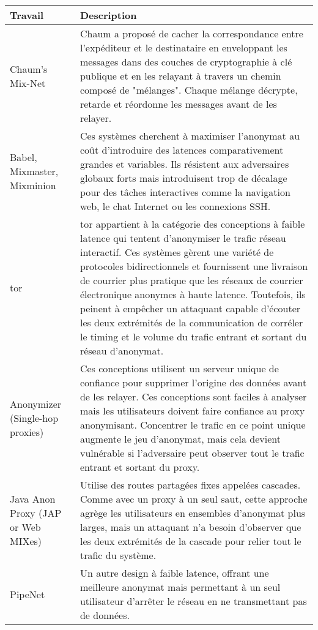 \begin{table}[htbp]
    \centering
    \begin{tabularx}{\textwidth}{
        >{\raggedright\arraybackslash}p{2cm} 
        >{\raggedright\arraybackslash}X}
    \toprule
    \rowcolor[HTML]{EFEFEF}
    \textbf{Travail} & \textbf{Description} \\
    \midrule
    Chaum's Mix-Net & Chaum a proposé de cacher la correspondance entre l'expéditeur et le destinataire en enveloppant les messages dans des couches de cryptographie à clé publique et en les relayant à travers un chemin composé de "mélanges". Chaque mélange décrypte, retarde et réordonne les messages avant de les relayer. \\
    \midrule
    Babel, Mixmaster, Mixminion & Ces systèmes cherchent à maximiser l'anonymat au coût d'introduire des latences comparativement grandes et variables. Ils résistent aux adversaires globaux forts mais introduisent trop de décalage pour des tâches interactives comme la navigation web, le chat Internet ou les connexions SSH. \\
    \midrule
    \acrshort{tor} & \acrshort{tor} appartient à la catégorie des conceptions à faible latence qui tentent d'anonymiser le trafic réseau interactif. Ces systèmes gèrent une variété de protocoles bidirectionnels et fournissent une livraison de courrier plus pratique que les réseaux de courrier électronique anonymes à haute latence. Toutefois, ils peinent à empêcher un attaquant capable d'écouter les deux extrémités de la communication de corréler le timing et le volume du trafic entrant et sortant du réseau d'anonymat. \\
    \midrule
    Anonymizer (Single-hop proxies) & Ces conceptions utilisent un serveur unique de confiance pour supprimer l'origine des données avant de les relayer. Ces conceptions sont faciles à analyser mais les utilisateurs doivent faire confiance au proxy anonymisant. Concentrer le trafic en ce point unique augmente le jeu d'anonymat, mais cela devient vulnérable si l'adversaire peut observer tout le trafic entrant et sortant du proxy. \\
    \midrule
    Java Anon Proxy (JAP \acrshort{or} Web MIXes) & Utilise des routes partagées fixes appelées cascades. Comme avec un proxy à un seul saut, cette approche agrège les utilisateurs en ensembles d'anonymat plus larges, mais un attaquant n'a besoin d'observer que les deux extrémités de la cascade pour relier tout le trafic du système. \\
    \midrule
    PipeNet & Un autre design à faible latence, offrant une meilleure anonymat mais permettant à un seul utilisateur d'arrêter le réseau en ne transmettant pas de données. \\

\end{tabularx}
\end{table}
